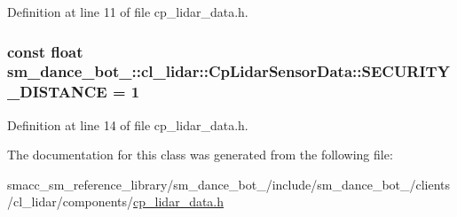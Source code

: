 Definition at line 11 of file cp\+\_\+lidar\+\_\+data.\+h.

\subsubsection[{\texorpdfstring{S\+E\+C\+U\+R\+I\+T\+Y\+\_\+\+D\+I\+S\+T\+A\+N\+CE}{SECURITY_DISTANCE}}]{\setlength{\rightskip}{0pt plus 5cm}const float sm\+\_\+dance\+\_\+bot\+\_\+::cl\+\_\+lidar\+::\+Cp\+Lidar\+Sensor\+Data\+::\+S\+E\+C\+U\+R\+I\+T\+Y\+\_\+\+D\+I\+S\+T\+A\+N\+CE = 1}\hypertarget{classsm__dance__bot__2_1_1cl__lidar_1_1CpLidarSensorData_aa91ab36fbbd8a0f359d055a33ee89fa4}{}\label{classsm__dance__bot__2_1_1cl__lidar_1_1CpLidarSensorData_aa91ab36fbbd8a0f359d055a33ee89fa4}


Definition at line 14 of file cp\+\_\+lidar\+\_\+data.\+h.



The documentation for this class was generated from the following file\+:\begin{DoxyCompactItemize}
\item 
smacc\+\_\+sm\+\_\+reference\+\_\+library/sm\+\_\+dance\+\_\+bot\+\_/include/sm\+\_\+dance\+\_\+bot\+\_/clients/cl\+\_\+lidar/components/\hyperlink{cp__lidar__data_8h}{cp\+\_\+lidar\+\_\+data.\+h}\end{DoxyCompactItemize}
